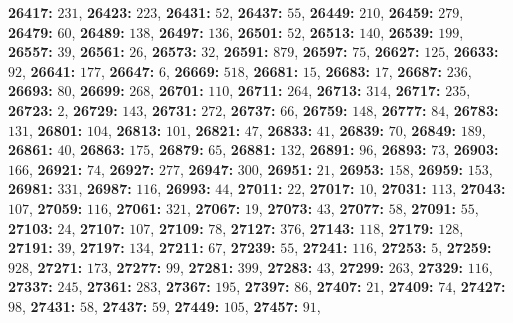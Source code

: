 \textsf{\bfseries 26417:} $231$, \textsf{\bfseries 26423:} $223$, \textsf{\bfseries 26431:} $52$, \textsf{\bfseries 26437:} $55$, \textsf{\bfseries 26449:} $210$, \textsf{\bfseries 26459:} $279$, \textsf{\bfseries 26479:} $60$, \textsf{\bfseries 26489:} $138$, \textsf{\bfseries 26497:} $136$, \textsf{\bfseries 26501:} $52$, \textsf{\bfseries 26513:} $140$, \textsf{\bfseries 26539:} $199$, \textsf{\bfseries 26557:} $39$, \textsf{\bfseries 26561:} $26$, \textsf{\bfseries 26573:} $32$, \textsf{\bfseries 26591:} $879$, \textsf{\bfseries 26597:} $75$, \textsf{\bfseries 26627:} $125$, \textsf{\bfseries 26633:} $92$, \textsf{\bfseries 26641:} $177$, \textsf{\bfseries 26647:} $6$, \textsf{\bfseries 26669:} $518$, \textsf{\bfseries 26681:} $15$, \textsf{\bfseries 26683:} $17$, \textsf{\bfseries 26687:} $236$, \textsf{\bfseries 26693:} $80$, \textsf{\bfseries 26699:} $268$, \textsf{\bfseries 26701:} $110$, \textsf{\bfseries 26711:} $264$, \textsf{\bfseries 26713:} $314$, \textsf{\bfseries 26717:} $235$, \textsf{\bfseries 26723:} $2$, \textsf{\bfseries 26729:} $143$, \textsf{\bfseries 26731:} $272$, \textsf{\bfseries 26737:} $66$, \textsf{\bfseries 26759:} $148$, \textsf{\bfseries 26777:} $84$, \textsf{\bfseries 26783:} $131$, \textsf{\bfseries 26801:} $104$, \textsf{\bfseries 26813:} $101$, \textsf{\bfseries 26821:} $47$, \textsf{\bfseries 26833:} $41$, \textsf{\bfseries 26839:} $70$, \textsf{\bfseries 26849:} $189$, \textsf{\bfseries 26861:} $40$, \textsf{\bfseries 26863:} $175$, \textsf{\bfseries 26879:} $65$, \textsf{\bfseries 26881:} $132$, \textsf{\bfseries 26891:} $96$, \textsf{\bfseries 26893:} $73$, \textsf{\bfseries 26903:} $166$, \textsf{\bfseries 26921:} $74$, \textsf{\bfseries 26927:} $277$, \textsf{\bfseries 26947:} $300$, \textsf{\bfseries 26951:} $21$, \textsf{\bfseries 26953:} $158$, \textsf{\bfseries 26959:} $153$, \textsf{\bfseries 26981:} $331$, \textsf{\bfseries 26987:} $116$, \textsf{\bfseries 26993:} $44$, \textsf{\bfseries 27011:} $22$, \textsf{\bfseries 27017:} $10$, \textsf{\bfseries 27031:} $113$, \textsf{\bfseries 27043:} $107$, \textsf{\bfseries 27059:} $116$, \textsf{\bfseries 27061:} $321$, \textsf{\bfseries 27067:} $19$, \textsf{\bfseries 27073:} $43$, \textsf{\bfseries 27077:} $58$, \textsf{\bfseries 27091:} $55$, \textsf{\bfseries 27103:} $24$, \textsf{\bfseries 27107:} $107$, \textsf{\bfseries 27109:} $78$, \textsf{\bfseries 27127:} $376$, \textsf{\bfseries 27143:} $118$, \textsf{\bfseries 27179:} $128$, \textsf{\bfseries 27191:} $39$, \textsf{\bfseries 27197:} $134$, \textsf{\bfseries 27211:} $67$, \textsf{\bfseries 27239:} $55$, \textsf{\bfseries 27241:} $116$, \textsf{\bfseries 27253:} $5$, \textsf{\bfseries 27259:} $928$, \textsf{\bfseries 27271:} $173$, \textsf{\bfseries 27277:} $99$, \textsf{\bfseries 27281:} $399$, \textsf{\bfseries 27283:} $43$, \textsf{\bfseries 27299:} $263$, \textsf{\bfseries 27329:} $116$, \textsf{\bfseries 27337:} $245$, \textsf{\bfseries 27361:} $283$, \textsf{\bfseries 27367:} $195$, \textsf{\bfseries 27397:} $86$, \textsf{\bfseries 27407:} $21$, \textsf{\bfseries 27409:} $74$, \textsf{\bfseries 27427:} $98$, \textsf{\bfseries 27431:} $58$, \textsf{\bfseries 27437:} $59$, \textsf{\bfseries 27449:} $105$, \textsf{\bfseries 27457:} $91$, 
